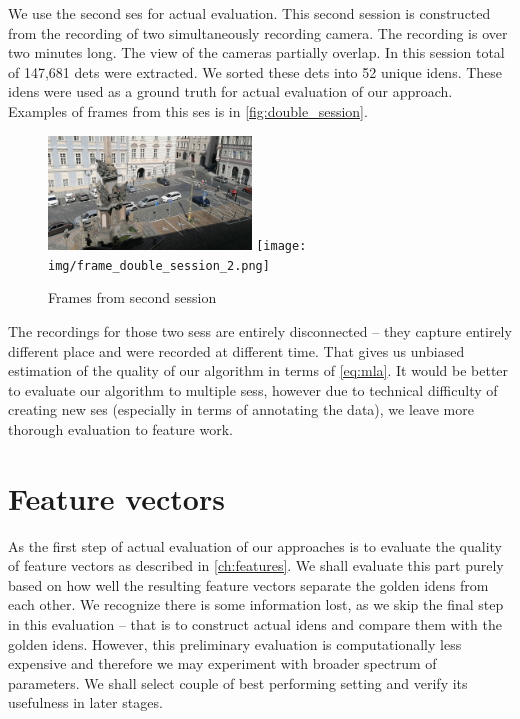 We use the second \gls{ses} for actual evaluation. This second session is
constructed from the recording of two simultaneously recording camera. The
recording is over two minutes long. The view of the cameras partially overlap.
In this session total of 147,681 \glspl{det} were extracted. We sorted these
\glspl{det} into 52 unique \glspl{iden}. These \glspl{iden} were used as a
ground truth for actual evaluation of our approach. Examples of frames from
this \gls{ses} is in \autoref{fig:double_session}.

\begin{figure}
    \centering
    \includegraphics[width=0.48\textwidth]{img/frame_double_session_1.png}
    \texttt{[image: img/frame\_double\_session\_2.png]}
    \caption{Frames from second session}
    \label{fig:double_session}
\end{figure}

The recordings for those two \glspl{ses} are entirely disconnected -- they
capture entirely different place and were recorded at different time. That gives
us unbiased estimation of the quality of our algorithm in terms of
\autoref{eq:mla}. It would be better to evaluate our algorithm to multiple
\glspl{ses}, however due to technical difficulty of creating new \gls{ses}
(especially in terms of annotating the data), we leave more thorough evaluation
to feature work.

\section{Feature vectors}

As the first step of actual evaluation of our approaches is to evaluate the
quality of feature vectors as described in \autoref{ch:features}. We shall
evaluate this part purely based on how well the resulting feature vectors
separate the golden \glspl{iden} from each other. We recognize there is some
information lost, as we skip the final step in this evaluation -- that is to
construct actual \glspl{iden} and compare them with the golden \glspl{iden}.
However, this preliminary evaluation is computationally less expensive and
therefore we may experiment with broader spectrum of parameters. We shall
select couple of best performing setting and verify its usefulness in later
stages.

